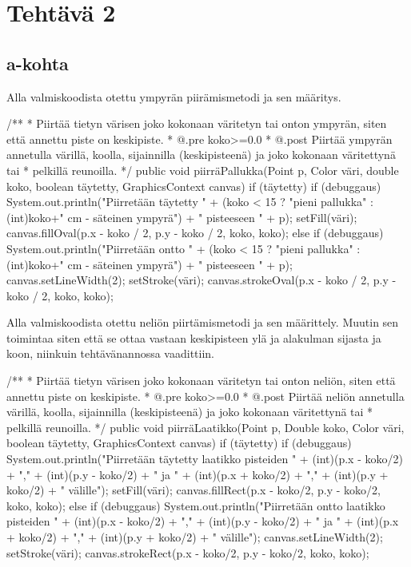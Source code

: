 
\chapter{Tehtävä 2 \label{chap:Teht=0000E4v=0000E4-2}}

\section{a-kohta}
\label{a-kohta}
Alla valmiskoodista otettu ympyrän piirämismetodi ja sen määritys.
\begin{javacode}
/**
* Piirtää tietyn värisen joko kokonaan väritetyn tai onton ympyrän, siten että annettu
  piste on keskipiste.
* @.pre koko>=0.0
* @.post Piirtää ympyrän annetulla värillä, koolla, sijainnilla (keskipisteenä) ja joko
  kokonaan väritettynä tai
* pelkillä reunoilla.
*/
  public void piirräPallukka(Point p, Color väri, double koko, boolean täytetty,
  GraphicsContext canvas) {
        if (täytetty){
            if (debuggaus) System.out.println("Piirretään täytetty " + (koko < 15 ?
            "pieni pallukka" : (int)koko+" cm - säteinen ympyrä") + " pisteeseen " + p);
            setFill(väri);
            canvas.fillOval(p.x - koko / 2, p.y - koko / 2, koko, koko);
        } else {
            if (debuggaus) System.out.println("Piirretään ontto " + (koko < 15 ?
            "pieni pallukka" : (int)koko+" cm - säteinen ympyrä") + " pisteeseen " + p);
            canvas.setLineWidth(2);
            setStroke(väri);
            canvas.strokeOval(p.x - koko / 2, p.y - koko / 2, koko, koko);
        }
    }
\end{javacode}

Alla valmiskoodista otettu neliön piirtämismetodi ja sen määrittely.
Muutin sen toimintaa siten että se ottaa vastaan keskipisteen ylä ja alakulman sijasta
ja koon, niinkuin tehtävänannossa vaadittiin.
\begin{javacode}
/**
* Piirtää tietyn värisen joko kokonaan väritetyn tai onton neliön, siten että annettu
  piste on keskipiste.
* @.pre koko>=0.0
* @.post Piirtää neliön annetulla värillä, koolla, sijainnilla (keskipisteenä) ja joko
  kokonaan väritettynä tai
* pelkillä reunoilla.
*/
    public void piirräLaatikko(Point p, Double koko, Color väri, boolean täytetty,
    GraphicsContext canvas) {
        if (täytetty) {
            if (debuggaus) System.out.println("Piirretään täytetty laatikko pisteiden "
            + (int)(p.x - koko/2) + "," + (int)(p.y - koko/2) + " ja " +
            (int)(p.x + koko/2) + "," + (int)(p.y + koko/2) + " välille");
            setFill(väri);
            canvas.fillRect(p.x - koko/2, p.y - koko/2, koko, koko);
        } else {
            if (debuggaus) System.out.println("Piirretään ontto laatikko pisteiden " +
            (int)(p.x - koko/2) + "," + (int)(p.y - koko/2) + " ja " +
            (int)(p.x + koko/2) + "," + (int)(p.y + koko/2) + " välille");
            canvas.setLineWidth(2);
            setStroke(väri);
            canvas.strokeRect(p.x - koko/2, p.y - koko/2, koko, koko);
        }
    }
\end{javacode}


